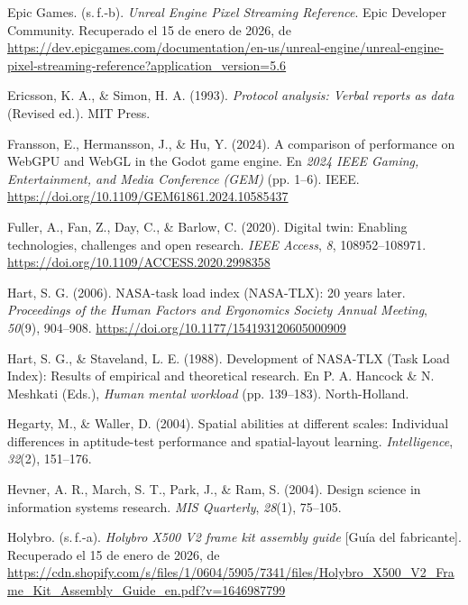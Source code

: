 \begin{list}{}
\item Epic Games. (s.\,f.-b). \textit{Unreal Engine Pixel Streaming Reference}. Epic Developer Community. Recuperado el 15 de enero de 2026, de \url{https://dev.epicgames.com/documentation/en-us/unreal-engine/unreal-engine-pixel-streaming-reference?application_version=5.6}

\item Ericsson, K. A., \& Simon, H. A. (1993). \textit{Protocol analysis: Verbal reports as data} (Revised ed.). MIT Press.

\item Fransson, E., Hermansson, J., \& Hu, Y. (2024). A comparison of performance on WebGPU and WebGL in the Godot game engine. En \textit{2024 IEEE Gaming, Entertainment, and Media Conference (GEM)} (pp. 1--6). IEEE. \url{https://doi.org/10.1109/GEM61861.2024.10585437}

\item Fuller, A., Fan, Z., Day, C., \& Barlow, C. (2020). Digital twin: Enabling technologies, challenges and open research. \textit{IEEE Access}, \textit{8}, 108952--108971. \url{https://doi.org/10.1109/ACCESS.2020.2998358}

\item Hart, S. G. (2006). NASA-task load index (NASA-TLX): 20 years later. \textit{Proceedings of the Human Factors and Ergonomics Society Annual Meeting}, \textit{50}(9), 904--908. \url{https://doi.org/10.1177/154193120605000909}

\item Hart, S. G., \& Staveland, L. E. (1988). Development of NASA-TLX (Task Load Index): Results of empirical and theoretical research. En P. A. Hancock \& N. Meshkati (Eds.), \textit{Human mental workload} (pp. 139--183). North-Holland.

\item Hegarty, M., \& Waller, D. (2004). Spatial abilities at different scales: Individual differences in aptitude-test performance and spatial-layout learning. \textit{Intelligence}, \textit{32}(2), 151--176.

\item Hevner, A. R., March, S. T., Park, J., \& Ram, S. (2004). Design science in information systems research. \textit{MIS Quarterly}, \textit{28}(1), 75--105.

\item Holybro. (s.\,f.-a). \textit{Holybro X500 V2 frame kit assembly guide} [Guía del fabricante]. Recuperado el 15 de enero de 2026, de \url{https://cdn.shopify.com/s/files/1/0604/5905/7341/files/Holybro_X500_V2_Frame_Kit_Assembly_Guide_en.pdf?v=1646987799}


\end{list}
